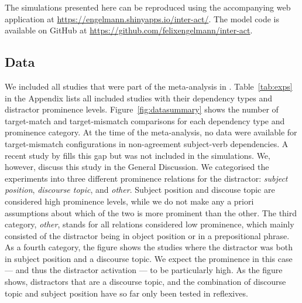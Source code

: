 \documentclass{cambridge7A}\usepackage[]{graphicx}\usepackage[]{color}
\begin{document}
The simulations presented here can be reproduced using the accompanying web application at \url{https://engelmann.shinyapps.io/inter-act/}.
The model code is available on GitHub at \url{https://github.com/felixengelmann/inter-act}.

\subsection{Data}
We included all studies that were part of the meta-analysis in \cite{JaegerEngelmannVasishth2017}. Table~\ref{tab:exps} in the Appendix lists all included studies with their dependency types and distractor prominence levels.
Figure~\ref{fig:datasummary} shows the number of target-match and target-mismatch comparisons for each dependency type and prominence category. At the time of the meta-analysis, no data were available for target-mismatch configurations in non-agreement subject-verb dependencies.
A recent study by \cite{CunningsSturt2018} fills this gap but was not included in the simulations. We, however, discuss this study in the General Discussion.
We categorised the experiments into three different prominence relations for the distractor: \textit{subject position}, \textit{discourse topic}, and \textit{other}. Subject position and discouse topic are considered high prominence levels, while we do not make any a priori assumptions about which of the two is more prominent than the other. The third category, \textit{other}, stands for all relations considered low prominence, which mainly consisted of the distractor being in object position or in a prepositional phrase. 
As a fourth category, the figure shows the studies where the distractor was both in subject position and a discourse topic. We expect the prominence in this case --- and thus the distractor activation --- to be particularly high.
As the figure shows, distractors that are a discourse topic, and the combination of discourse topic and subject position have so far only been tested in reflexives.
\end{document}
